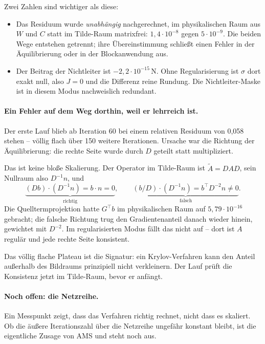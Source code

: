 \documentclass[11pt,a4paper]{article}
\begin{document}
Zwei Zahlen sind wichtiger als diese:

\begin{itemize}[nosep]
\item Das Residuum wurde \emph{unabhängig} nachgerechnet, im physikalischen
  Raum aus $W$ und $C$ statt im Tilde-Raum matrixfrei:
  $1{,}4\cdot10^{-8}$ gegen $5\cdot10^{-9}$. Die beiden Wege entstehen
  getrennt; ihre Übereinstimmung schließt einen Fehler in der Äquilibrierung
  oder in der Blockanwendung aus.
\item Der Beitrag der Nichtleiter ist $-2{,}2\cdot10^{-15}$\,N. Ohne
  Regularisierung ist $\sigma$ dort exakt null, also $J = 0$ und die Differenz
  reine Rundung. Die Nichtleiter-Maske ist in diesem Modus nachweislich
  redundant.
\end{itemize}

\paragraph{Ein Fehler auf dem Weg dorthin, weil er lehrreich ist.} Der erste
Lauf blieb ab Iteration 60 bei einem relativen Residuum von 0,058 stehen --
völlig flach über 150 weitere Iterationen. Ursache war die Richtung der
Äquilibrierung: die rechte Seite wurde durch $D$ geteilt statt multipliziert.

Das ist keine bloße Skalierung. Der Operator im Tilde-Raum ist
$\tilde A = DAD$, sein Nullraum also $D^{-1}n$, und
\begin{equation}
  \underbrace{(Db)\cdot(D^{-1}n) = b\cdot n = 0}_{\text{richtig}},
  \qquad
  \underbrace{(b/D)\cdot(D^{-1}n) = b^{\!\top}D^{-2}n \neq 0}_{\text{falsch}} .
\end{equation}
Die Quelltermprojektion hatte $G^{\!\top}b$ im physikalischen Raum auf
$5{,}79\cdot10^{-16}$ gebracht; die falsche Richtung trug den Gradientenanteil
danach wieder hinein, gewichtet mit $D^{-2}$. Im regularisierten Modus fällt
das nicht auf -- dort ist $A$ regulär und jede rechte Seite konsistent.

Das völlig flache Plateau ist die Signatur: ein Krylov-Verfahren kann den
Anteil außerhalb des Bildraums prinzipiell nicht verkleinern. Der Lauf prüft
die Konsistenz jetzt im Tilde-Raum, bevor er anfängt.

\paragraph{Noch offen: die Netzreihe.} Ein Messpunkt zeigt, dass das Verfahren
richtig rechnet, nicht dass es skaliert. Ob die äußere Iterationszahl über die
Netzreihe ungefähr konstant bleibt, ist die eigentliche Zusage von AMS und
steht noch aus.
\end{document}
